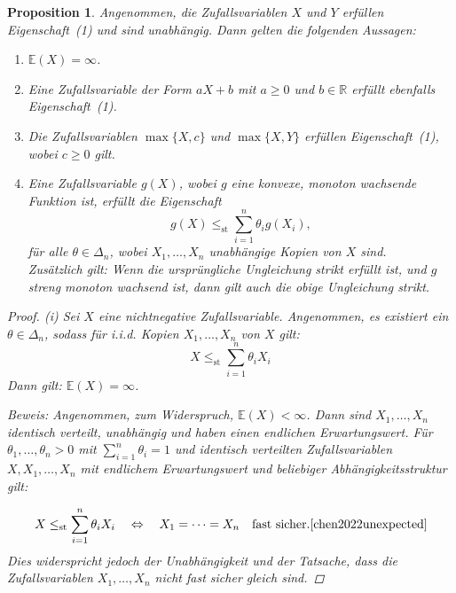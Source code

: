 \documentclass[
12pt,
fancyheadings, %
%
a4paper, 
%
]{tuhhreprt}
\newtheorem{proposition}[definition]{Proposition}
\begin{document}
\begin{proposition}
Angenommen, die Zufallsvariablen \( X \) und \( Y \) erfüllen Eigenschaft~(1) und sind unabhängig. Dann gelten die folgenden Aussagen:
\begin{enumerate}[label=\roman*)]
    \item \( \mathbb{E}(X) = \infty \).\cite{ChenShneer2024}
    \item Eine Zufallsvariable der Form \( aX + b \) mit \( a \geq 0 \) und \( b \in \mathbb{R} \) erfüllt ebenfalls Eigenschaft~(1).\cite{ChenShneer2024}
    \item Die Zufallsvariablen \( \max\{X, c\} \) und \( \max\{X, Y\} \) erfüllen Eigenschaft~(1), wobei \( c \geq 0 \) gilt.\cite{ChenShneer2024}
\item Eine Zufallsvariable \( g(X) \), wobei \( g \) eine konvexe, monoton wachsende Funktion ist, erfüllt die Eigenschaft
\[
g(X) \le_{\text{st}} \sum_{i=1}^n \theta_i g(X_i),
\]
für alle \( \theta \in \Delta_n \), wobei \( X_1, \dots, X_n \) unabhängige Kopien von \( X \) sind.\\
Zusätzlich gilt: Wenn die ursprüngliche Ungleichung strikt erfüllt ist, und \( g \) streng monoton wachsend ist, dann gilt auch die obige Ungleichung strikt. \cite{ChenShneer2024}


\end{enumerate}

\begin{proof}
\textit{(i)} Sei \( X \) eine nichtnegative Zufallsvariable. Angenommen, es existiert ein \( \theta \in \Delta_n \), sodass für i.i.d. Kopien \( X_1, \dots, X_n \) von \( X \) gilt:
\[
X \leq_{\mathrm{st}} \sum_{i=1}^n \theta_i X_i \tag{2}
\]
Dann gilt: \( \mathbb{E}(X) = \infty \). 

\textit{Beweis:} Angenommen, zum Widerspruch, \( \mathbb{E}(X) < \infty \). Dann sind \( X_1, \dots, X_n \) identisch verteilt, unabhängig und haben einen endlichen Erwartungswert. Für \( \theta_1, \ldots, \theta_n > 0 \) mit \( \sum_{i=1}^n \theta_i = 1 \) und identisch verteilten Zufallsvariablen \( X, X_1, \ldots, X_n \) mit endlichem Erwartungswert und beliebiger Abhängigkeitsstruktur gilt:

\[
X \leq_{\mathrm{st}} \sum_{i=1}^n \theta_i X_i
\quad \Leftrightarrow \quad
X_1 = \cdots = X_n \quad \text{fast sicher}. \cite[Proposition~2]{chen2022unexpected}
\]Dies widerspricht jedoch der Unabhängigkeit und der Tatsache, dass die Zufallsvariablen \( X_1, \dots, X_n \) nicht fast sicher gleich sind.
 

\end{proof}
\end{proposition}
\end{document}
